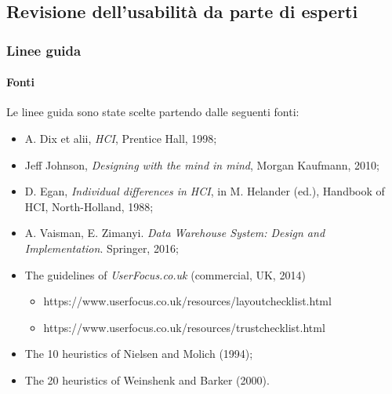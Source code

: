 \subsection{Revisione dell'usabilità da parte di esperti}

\subsubsection{Linee guida}

\paragraph{Fonti}
Le linee guida sono state scelte partendo dalle seguenti fonti:
\begin{itemize}
    \item A. Dix et alii, \textit{HCI}, Prentice Hall, 1998;
    \item Jeff Johnson, \textit{Designing with the mind in mind}, Morgan Kaufmann, 2010;
    \item D. Egan, \textit{Individual differences in HCI}, in M. Helander (ed.), Handbook of HCI, North-Holland, 1988;
    \item A. Vaisman, E. Zimanyi. \textit{Data Warehouse System: Design and Implementation}. Springer, 2016;
    \item The guidelines of \textit{UserFocus.co.uk} (commercial, UK, 2014)
    \begin{itemize}
        \item https://www.userfocus.co.uk/resources/layoutchecklist.html
        \item https://www.userfocus.co.uk/resources/trustchecklist.html
    \end{itemize}
    \item The 10 heuristics of Nielsen and Molich (1994);
    \item The 20 heuristics of Weinshenk and Barker (2000).
\end{itemize}

